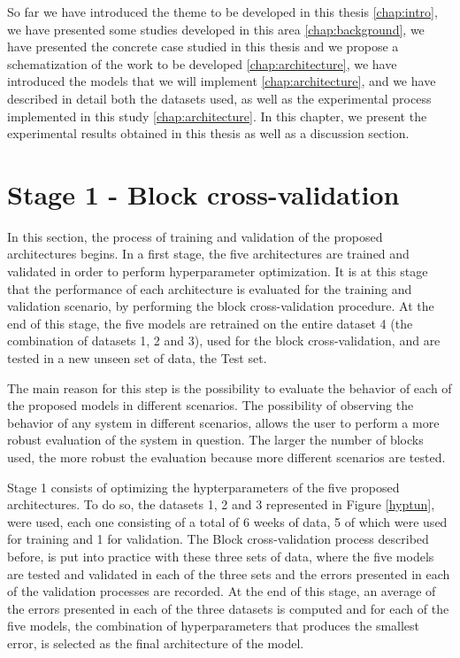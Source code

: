 \cleardoublepage
\label{chap:results}

So far we have introduced the theme to be developed in this thesis \ref{chap:intro}, we have presented some studies developed in this area \ref{chap:background}, we have presented the concrete case studied in this thesis and we propose a schematization of the work to be developed \ref{chap:architecture}, we have introduced the models that we will implement \ref{chap:architecture}, and we have described in detail both the datasets used, as well as the experimental process implemented in this study \ref{chap:architecture}. In this chapter, we present the experimental results obtained in this thesis as well as a discussion section.


\section{Stage 1 - Block cross-validation}\label{chap3:section:stage_1}

In this section, the process of training and validation of the proposed architectures begins. In a first stage, the five architectures are trained and validated in order to perform hyperparameter optimization. It is at this stage that the performance of each architecture is evaluated for the training and validation scenario, by performing the block cross-validation procedure. At the end of this stage, the five models are retrained on the entire dataset 4 (the combination of datasets 1, 2 and 3), used for the block cross-validation, and are tested in a new unseen set of data, the Test set.

The main reason for this step is the possibility to evaluate the behavior of each of the proposed models in different scenarios. The possibility of observing the behavior of any system in different scenarios, allows the user to perform a more robust evaluation of the system in question. The larger the number of blocks used, the more robust the evaluation because more different scenarios are tested.




Stage 1 consists of optimizing the hypterparameters of the five proposed architectures. To do so, the datasets 1, 2 and 3 represented in Figure \ref{hyptun}, were used, each one consisting of a total of 6 weeks of data, 5 of which were used for training and 1 for validation. The Block cross-validation process described before, is put into practice with these three sets of data, where the five models are tested and validated in each of the three sets and the errors presented in each of the validation processes are recorded. At the end of this stage, an average of the errors presented in each of the three datasets is computed and for each of the five models, the combination of hyperparameters that produces the smallest error, is selected as the final architecture of the model. 

